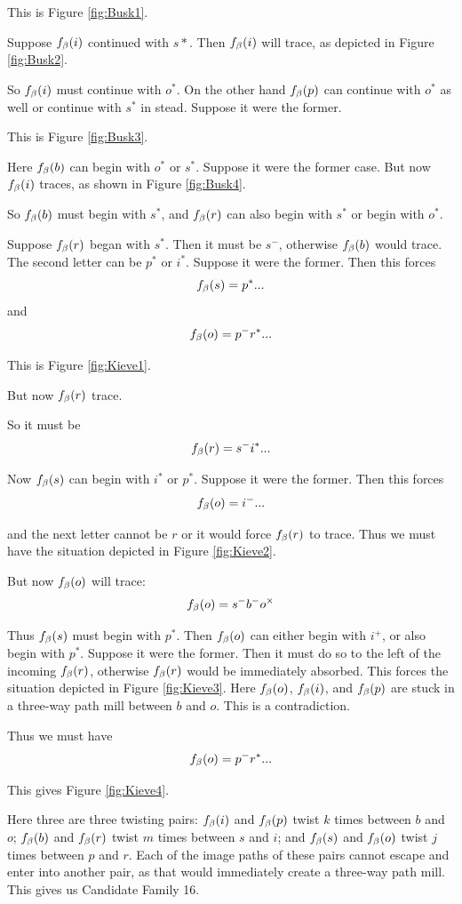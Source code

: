 This is Figure \ref{fig:Busk1}.

Suppose $f_\beta(i)$ continued with $s*$. Then $f_\beta(i)$ will trace, as depicted in Figure \ref{fig:Busk2}.

So $f_\beta(i)$ must continue with $o^*$. On the other hand $f_\beta(p)$ can continue with $o^*$ as well or continue with $s^*$ in stead. Suppose it were the former.

This is Figure \ref{fig:Busk3}.

Here $f_\beta(b)$ can begin with $o^*$ or $s^*$. Suppose it were the former case. But now $f_\beta(i)$ traces, as shown in Figure \ref{fig:Busk4}.

So $f_\beta(b)$ must begin with $s^*$, and $f_\beta(r)$ can also begin with $s^*$ or begin with $o^*$.

\label{Kieve}
Suppose $f_\beta(r)$ began with $s^*$. Then it must be $s^-$, otherwise $f_\beta(b)$ would trace. The second letter can be $p^*$ or $i^*$. Suppose it were the former. Then this forces
$$f_\beta(s) = p^*...$$
and
$$f_\beta(o) = p^- r^*...$$

This is Figure \ref{fig:Kieve1}.

But now $f_\beta(r)$ trace.

So it must be 
$$f_\beta(r) = s^- i^*...$$

Now $f_\beta(s)$ can begin with  $i^*$ or $p^*$. Suppose it were the former. Then this forces
$$f_\beta(o) = i^-...$$

and the next letter cannot be $r$ or it would force $f_\beta(r)$ to trace. Thus we must have the situation depicted in Figure \ref{fig:Kieve2}.

But now $f_\beta(o)$ will trace:
$$f_\beta(o) = s^- b^- o^\times$$

Thus $f_\beta(s)$ must begin with $p^*$. Then $f_\beta(o)$ can either begin with $i^+$, or also begin with $p^*$. Suppose it were the former. Then it must do so to the left of the incoming $f_\beta(r)$, otherwise $f_\beta(r)$ would be immediately absorbed. This forces the situation depicted in Figure \ref{fig:Kieve3}. Here $f_\beta(o)$, $f_\beta(i)$, and $f_\beta(p)$ are stuck in a three-way path mill between $b$ and $o$. This is a contradiction.

Thus we must have
$$f_\beta(o) = p^- r^*...$$

This gives Figure \ref{fig:Kieve4}.

Here three are three twisting pairs: $f_\beta(i)$ and $f_\beta(p)$ twist $k$ times between $b$ and $o$; $f_\beta(b)$ and $f_\beta(r)$ twist $m$ times between $s$ and $i$; and $f_\beta(s)$ and $f_\beta(o)$ twist $j$ times between $p$ and $r$. Each of the image paths of these pairs cannot escape and enter into another pair, as that would immediately create a three-way path mill. This gives us Candidate Family 16.

